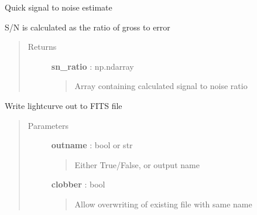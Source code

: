 \documentclass[letterpaper,10pt,english]{sphinxmanual}
\begin{document}
\begin{fulllineitems}
\begin{fulllineitems}
\begin{quote}
\begin{description}
\end{description}\end{quote}

\end{fulllineitems}


\begin{fulllineitems}
\label{index:lightcurve.lightcurve.LightCurve.signal_to_noise}
Quick signal to noise estimate

S/N is calculated as the ratio of gross to error
\begin{quote}\begin{description}
\item[{Returns }] \leavevmode
\textbf{sn\_ratio} : np.ndarray
\begin{quote}

Array containing calculated signal to noise ratio
\end{quote}

\end{description}\end{quote}

\end{fulllineitems}


\begin{fulllineitems}
\label{index:lightcurve.lightcurve.LightCurve.write}
Write lightcurve out to FITS file
\begin{quote}\begin{description}
\item[{Parameters }] \leavevmode
\textbf{outname} : bool or str
\begin{quote}

Either True/False, or output name
\end{quote}

\textbf{clobber} : bool
\begin{quote}

Allow overwriting of existing file with same name
\end{quote}

\end{description}\end{quote}

\end{fulllineitems}


\end{fulllineitems}
\end{document}
